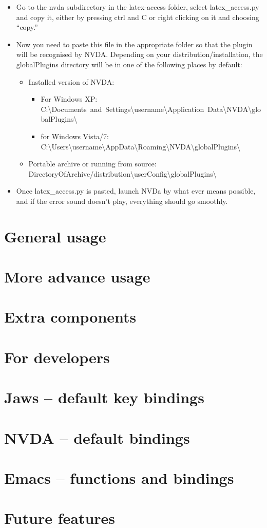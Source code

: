 \documentclass[12pt,a4paper]{report}
\begin{document}
\begin{itemize}
\item Go to the nvda subdirectory in the latex-access folder, select latex\_access.py and copy it, either by pressing ctrl and C or right clicking on it and choosing ``copy.''
\item Now you need to paste this file in the appropriate folder so that the plugin will be recognised by NVDA.  Depending on your distribution/installation, the globalPlugins directory will be in one of the following places by default:
\begin{itemize}
\item Installed version of NVDA:
\begin{itemize}
\item For Windows XP:\\
\mbox{C:\textbackslash Documents and Settings\textbackslash username\textbackslash Application Data\textbackslash NVDA\textbackslash globalPlugins\textbackslash}
\item for Windows Vista/7:\\
\mbox{C:\textbackslash Users\textbackslash username\textbackslash AppData\textbackslash Roaming\textbackslash NVDA\textbackslash globalPlugins\textbackslash}
\end{itemize}
\item Portable archive or running from source:\\
\mbox{DirectoryOfArchive/distribution\textbackslash userConfig\textbackslash globalPlugins\textbackslash}
\end{itemize}
\item Once latex\_access.py is pasted, launch NVDa by what ever means possible, and if the error sound doesn't play, everything should go smoothly.
\end{itemize}

\chapter{General usage}
\label{ch-general-usage}
\chapter{More advance usage}
\label{ch-more-advanced-usage}
\chapter{Extra components}
\label{ch-extra-components}
\chapter{For developers}
\label{ch-for-developers}

\appendix
\chapter{Jaws -- default key bindings}
\label{ap-jaws}
\chapter{NVDA -- default bindings}
\label{ap-nvda}
\chapter{Emacs -- functions and bindings}
\label{AP-emacs}
\chapter{Future features}
\label{AP-future}
\end{document}
